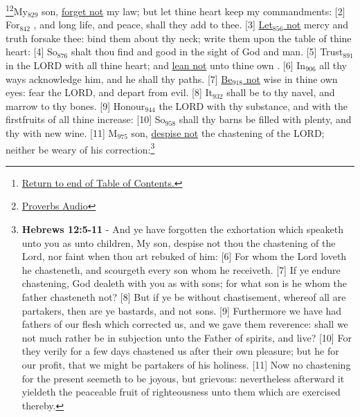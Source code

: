 \footnote{\textcolor[cmyk]{0.99998,1,0,0}{\hyperlink{TOC}{Return to end of Table of Contents.}}}\footnote{\href{https://www.audioverse.org/english/audiobibles/books/ENGKJV/O/Prov/1}{\textcolor[cmyk]{0.99998,1,0,0}{Proverbs Audio}}}\textcolor[cmyk]{0.99998,1,0,0}{My\textcolor{jungle}{$_{829}$} son, \underline{forget not} my law; but let thine heart keep my commandments:}
[2] \textcolor[cmyk]{0.99998,1,0,0}{For\textcolor{jungle}{$_{842}$} , and long life, and peace, shall they add to thee.}
[3] \textcolor[cmyk]{0.99998,1,0,0}{\underline{Let\textcolor{jungle}{$_{856}$} not} mercy and truth forsake thee: bind them about thy neck; write them upon the table of thine heart:}
[4] \textcolor[cmyk]{0.99998,1,0,0}{So\textcolor{jungle}{$_{876}$} shalt thou find  and good  in the sight of God and man.}
[5] \textcolor[cmyk]{0.99998,1,0,0}{Trust\textcolor{jungle}{$_{891}$} in the LORD with all thine heart; and \underline{lean not} unto thine own .}
[6] \textcolor[cmyk]{0.99998,1,0,0}{In\textcolor{jungle}{$_{906}$} all thy ways acknowledge him, and he shall  thy paths.}
[7] \textcolor[cmyk]{0.99998,1,0,0}{\underline{Be\textcolor{jungle}{$_{918}$} not} wise in thine own eyes: fear the LORD, and depart from evil.}
[8] \textcolor[cmyk]{0.99998,1,0,0}{It\textcolor{jungle}{$_{932}$} shall be  to thy navel, and marrow to thy bones.}
[9] \textcolor[cmyk]{0.99998,1,0,0}{Honour\textcolor{jungle}{$_{944}$} the LORD with thy substance, and with the firstfruits of all thine increase:}
[10] \textcolor[cmyk]{0.99998,1,0,0}{So\textcolor{jungle}{$_{958}$} shall thy barns be filled with plenty, and thy  with new wine.}
[11] \textcolor[cmyk]{0.99998,1,0,0}{M\textcolor{jungle}{$_{975}$} son, \underline{despise not} the chastening of the LORD; neither be weary of his correction:}\footnote{\textbf{Hebrews 12:5-11} - And ye have forgotten the exhortation which speaketh unto you as unto children, My son, despise not thou the chastening of the Lord, nor faint when thou art rebuked of him: [6] For whom the Lord loveth he chasteneth, and scourgeth every son whom he receiveth. [7] If ye endure chastening, God dealeth with you as with sons; for what son is he whom the father chasteneth not? [8] But if ye be without chastisement, whereof all are partakers, then are ye bastards, and not sons. [9] Furthermore we have had fathers of our flesh which corrected us, and we gave them reverence: shall we not much rather be in subjection unto the Father of spirits, and live? [10] For they verily for a few days chastened us after their own pleasure; but he for our profit, that we might be partakers of his holiness. [11] Now no chastening for the present seemeth to be joyous, but grievous: nevertheless afterward it yieldeth the peaceable fruit of righteousness unto them which are exercised thereby.}
